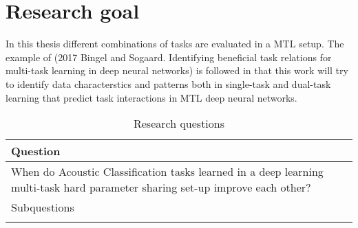 \chapter{Research goal}
	In this thesis different combinations of tasks are evaluated in a MTL setup. The example of (2017 Bingel and Sogaard. Identifying beneficial task relations for multi-task learning in deep neural networks) is followed in that this work will try to identify data characterstics and patterns both in single-task and dual-task learning that predict task interactions in MTL deep neural networks. 
	
	\begin{table}[ht]
		\caption{Research questions} %
		\centering %
		\begin{tabular}{p{\textwidth}} %
			\hline\hline %
			Question \\ [0.5ex] %
			\hline %
			When do Acoustic Classification tasks learned in a deep learning multi-task hard parameter sharing set-up improve each other? \\ %
			
			\hline\hline %
			Subquestions \\ [0.5ex] %
			\hline %
			
			\\ [1ex] %
			\hline %
		\end{tabular}
		\label{table:questions} %
	\end{table}
	